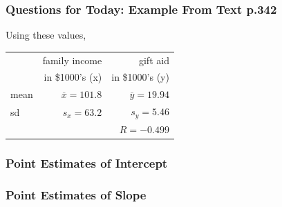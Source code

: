 \documentclass[handout]{beamer}
\newcommand{\blue}[1]{\textcolor{blue2}{#1}}
\begin{document}
\begin{frame}[fragile]
\frametitle{Questions for Today: Example From Text p.342}
Using these values,
\begin{center}
\begin{tabular}{l|rr}
& family income & gift aid \\
& in \$1000's (x) & in \$1000's (y) \\ 
\hline
mean & $\overline{x}=101.8$ & $\overline{y}=19.94$ \\ 
sd & $s_x=63.2$ & $s_y=5.46$ \\ 
\hline
 &  & $R=-0.499$ \\ 
\hline
\end{tabular}
\end{center}

%
%

\end{frame}


\begin{frame}[fragile]
\frametitle{Point Estimates of Intercept}
%
%
%

\end{frame}


\begin{frame}[fragile]
\frametitle{Point Estimates of Slope}

%
%
%
%


\end{frame}
\end{document}
